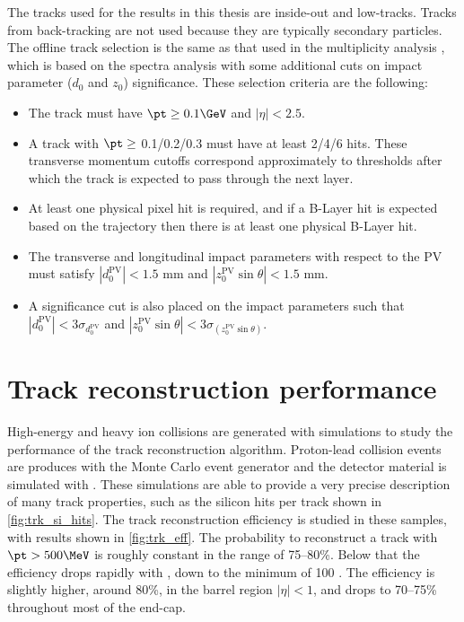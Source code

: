 The tracks used for the results in this thesis are inside-out and low-\pt tracks.
Tracks from back-tracking are not used because they are typically secondary particles.
The offline track selection is the same as that used in the \pPb multiplicity analysis \cite{HION-2012-15}, which is based on the \pp \minbias spectra analysis \cite{STDM-2010-06} with some additional cuts on impact parameter ($d_0$ and $z_0$) significance.
These selection criteria are the following:
\begin{itemize}
\item
  The track must have $\pt \geq 0.1 \GeV$ and $|\eta| < 2.5$.
\item
  A track with $\pt \geq $ 0.1/0.2/0.3 \GeV must have at least 2/4/6 \sct hits.
  These transverse momentum cutoffs correspond approximately to thresholds after which the track is expected to pass through the next \sct layer.
\item
  At least one physical pixel hit is required, and if a B-Layer hit is expected based on the trajectory then there is at least one physical B-Layer hit.
\item
  The transverse and longitudinal impact parameters with respect to the \ac{PV} must satisfy $|d_0^\textrm{PV}| < 1.5 \textrm{ mm}$ and $|z_0^\textrm{PV} \sin\theta| < 1.5 \textrm{ mm}$.
\item
  A significance cut is also placed on the impact parameters such that $|d_0^\textrm{PV}| < 3\sigma_{d_0^\textrm{PV}}$ and $|z_0^\textrm{PV} \sin\theta| < 3\sigma_{(z_0^\textrm{PV} \sin\theta)}$.
\end{itemize}


\section{Track reconstruction performance}

High-energy \pp and heavy ion collisions are generated with \mc simulations to study the performance of the track reconstruction algorithm.
Proton-lead collision events are produces with the \Hijing Monte Carlo event generator \cite{Gyulassy:1994ew} and the detector material is simulated with \GEANTFour \cite{Agostinelli:2002hh}.
These simulations are able to provide a very precise description of many track properties, such as the silicon hits per track shown in \cref{fig:trk_si_hits}.
The track reconstruction efficiency is studied in these \mc samples, with results shown in \cref{fig:trk_eff}.
The probability to reconstruct a track with $\pt > 500 \MeV$ is roughly constant in the range of 75--80\%.
Below that the efficiency drops rapidly with \pt, down to the minimum \pt of 100 \MeV.
The efficiency is slightly higher, around 80\%, in the barrel region $|\eta| < 1$, and drops to 70--75\% throughout most of the end-cap.

